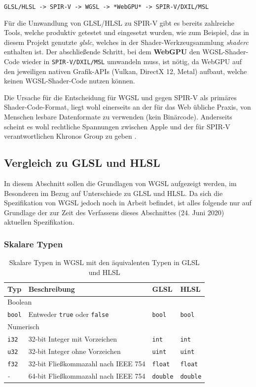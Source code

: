 \documentclass[oneside]{ausarbeitung}
\begin{document}
\texttt{GLSL/HLSL -> SPIR-V -> WGSL -> *WebGPU* -> SPIR-V/DXIL/MSL}

Für die Umwandlung von GLSL/HLSL zu SPIR-V gibt es bereits zahlreiche Tools, welche produktiv getestet und eingesetzt wurden, wie zum Beispiel, das in diesem Projekt genutzte \textit{glslc}, welches in der Shader-Werkzeugsammlung \textit{shaderc} \cite{shaderc} enthalten ist. Der abschließende Schritt, bei dem \textbf{WebGPU} den WGSL-Shader-Code wieder in \texttt{SPIR-V/DXIL/MSL} umwandeln muss, ist nötig, da WebGPU auf den jeweiligen nativen Grafik-APIs (Vulkan, DirectX 12, Metal) aufbaut, welche keinen WGSL-Shader-Code nutzen können.

Die Ursache für die Entscheidung für WGSL und gegen SPIR-V als primäres Shader-Code-Format, liegt wohl einerseits an der für das Web übliche Praxis, von Menschen lesbare Datenformate zu verwenden (kein Binärcode). Anderseits scheint es wohl rechtliche Spannungen zwischen Apple und der für SPIR-V verantwortlichen Khronos Group zu geben \cite[Vgl.][]{hacker_news:apple_khronos}.

\subsection{Vergleich zu GLSL und HLSL}
In diesem Abschnitt sollen die Grundlagen von WGSL aufgezeigt werden, im Besonderen im Bezug auf Unterschiede zu GLSL und HLSL. Da sich die Spezifikation von WGSL jedoch noch in Arbeit befindet, ist alles folgende nur auf Grundlage der zur Zeit des Verfassens dieses Abschnittes (24. Juni 2020) aktuellen Spezifikation.

\subsubsection{Skalare Typen}
\label{sub:scalars}
\begin{table}[htb]
\begin{center}
\begin{tabular}{ |l|l|l|l| }
    \hline
    \textbf{Typ} & \textbf{Beschreibung} & \textbf{GLSL} & \textbf{HLSL} \\
    \hline
    \multicolumn{4}{|l|}{Boolean} \\
    \hline
    \texttt{bool} & Entweder \texttt{true} oder \texttt{false} & \texttt{bool} & \texttt{bool} \\
    \hline
    \multicolumn{4}{|l|}{Numerisch} \\
    \hline
    \texttt{i32} & 32-bit Integer mit Vorzeichen & \texttt{int} & \texttt{int} \\
    \hline
    \texttt{u32} & 32-bit Integer ohne Vorzeichen & \texttt{uint} & \texttt{uint} \\
    \hline
    \texttt{f32} & 32-bit Fließkommazahl nach IEEE 754 & \texttt{float} & \texttt{float} \\
    \hline
    \textit{-} & 64-bit Fließkommazahl nach IEEE 754 & \texttt{double} & \texttt{double} \\
    \hline
\end{tabular}
\end{center}
\caption{Skalare Typen in WGSL mit den äquivalenten Typen in GLSL und HLSL}
\label{tab:scalars}
\end{table}
\end{document}
